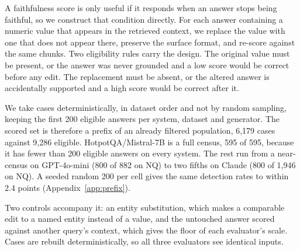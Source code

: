 \documentclass[11pt]{article}
\begin{document}
A faithfulness score is only useful if it responds when an answer stops being faithful, so we construct that condition directly. For each answer containing a numeric value that appears in the retrieved context, we replace the value with one that does not appear there, preserve the surface format, and re-score against the same chunks. Two eligibility rules carry the design. The original value must be present, or the answer was never grounded and a low score would be correct before any edit. The replacement must be absent, or the altered answer is accidentally supported and a high score would be correct after it.

We take cases deterministically, in dataset order and not by random sampling, keeping the first 200 eligible answers per system, dataset and generator. The scored set is therefore a prefix of an already filtered population, 6,179 cases against 9,286 eligible. HotpotQA/Mistral-7B is a full census, 595 of 595, because it has fewer than 200 eligible answers on every system. The rest run from a near-census on GPT-4o-mini (800 of 882 on NQ) to two fifths on Claude (800 of 1,946 on NQ). A seeded random 200 per cell gives the same detection rates to within 2.4 points (Appendix~\ref{app:prefix}).

Two controls accompany it: an entity substitution, which makes a comparable edit to a named entity instead of a value, and the untouched answer scored against another query's context, which gives the floor of each evaluator's scale. Cases are rebuilt deterministically, so all three evaluators see identical inputs.
\end{document}
